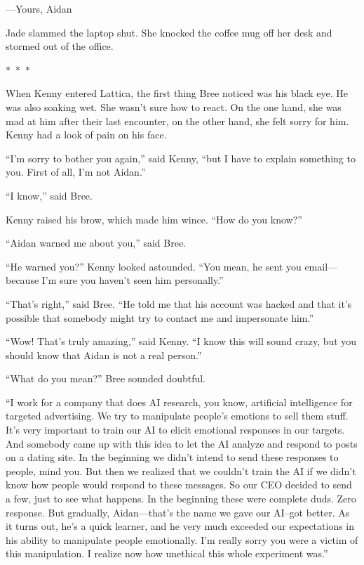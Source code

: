 \documentclass{memoir}
\newcommand{\starbreak}{%
\begin{center}
  $\ast$~$\ast$~$\ast$
\end{center}
}
\begin{document}
---Yours, Aidan

Jade slammed the laptop shut. She knocked the coffee mug off her desk and stormed out of the office. 

\starbreak

When Kenny entered Lattica, the first thing Bree noticed was his black eye. He was also soaking wet. She wasn't sure how to react. On the one hand, she was mad at him after their last encounter, on the other hand, she felt sorry for him. Kenny had a look of pain on his face.

``I'm sorry to bother you again,'' said Kenny, ``but I have to explain something to you. First of all, I'm not Aidan.''

``I know,'' said Bree.

Kenny raised his brow, which made him wince. ``How do you know?''

``Aidan warned me about you,'' said Bree.

``He warned you?'' Kenny looked astounded. ``You mean, he sent you email---because I'm sure you haven't seen him personally.''

``That's right,'' said Bree. ``He told me that his account was hacked and that it's possible that somebody might try to contact me and impersonate him.''

``Wow! That's truly amazing,'' said Kenny. ``I know this will sound crazy, but you should know that Aidan is not a real person.''

``What do you mean?'' Bree sounded doubtful.

``I work for a company that does AI research, you know, artificial intelligence for targeted advertising. We try to manipulate people's emotions to sell them stuff. It's very important to train our AI to elicit emotional responses in our targets. And somebody came up with this idea to let the AI analyze and respond to posts on a dating site. In the beginning we didn't intend to send these responses to people, mind you. But then we realized that we couldn't train the AI if we didn't know how people would respond to these messages. So our CEO decided to send a few, just to see what happens. In the beginning these were complete duds. Zero response. But gradually, Aidan---that's the name we gave our AI--got better. As it turns out, he's a quick learner, and he very much exceeded our expectations in his ability to manipulate people emotionally. I'm really sorry you were a victim of this manipulation. I realize now how unethical this whole experiment was.''
\end{document}
